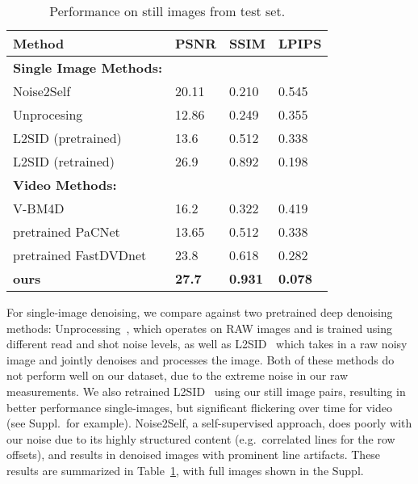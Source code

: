 \documentclass[final]{cvpr}
\begin{document}
\begin{table}[htbb]
\centering
\small
\begin{tabular}{|l|l|l|l|}
\hline
Method      & PSNR & SSIM & LPIPS\\ \hline
\textbf{Single Image Methods:} & & & \\ \hline
Noise2Self~\cite{batson2019noise2self} & 20.11 & 0.210 &  0.545 \\ \hline 
Unprocesing \cite{brooks2019unprocessing} & 12.86 & 0.249 & 0.355 \\ \hline 
L2SID (pretrained)~\cite{chen2018learning}      & 13.6 & 0.512& 0.338\\ \hline
L2SID (retrained) ~\cite{chen2018learning}    & 26.9 & 0.892 & 0.198 \\\hline
\textbf{Video Methods:} & & & \\ \hline
V-BM4D ~\cite{maggioni2012video}     & 16.2  & 0.322  & 0.419  \\\hline
pretrained PaCNet~\cite{vaksman2021patch}& 13.65 & 0.512  & 0.338 \\\hline
pretrained FastDVDnet~\cite{tassano2020fastdvdnet}& 23.8 &  0.618  & 0.282 \\\hline
\textbf{ours}        & \textbf{27.7}  & \textbf{0.931}   & \textbf{0.078}  \\\hline
\end{tabular}
\vspace{.5mm}
\caption{Performance on still images from test set.}
\label{tab:results_stills}
\vspace{-4mm}
\end{table}

For single-image denoising, we compare against two pretrained deep denoising methods: Unprocessing~\cite{brooks2019unprocessing}, which operates on RAW images and is trained using different read and shot noise levels, as well as L2SID~\cite{chen2018learning} which takes in a raw noisy image and jointly denoises and processes the image. Both of these methods do not perform well on our dataset, due to the extreme noise in our raw measurements. We also retrained L2SID~\cite{chen2018learning} using our still image pairs, resulting in better performance single-images, but significant flickering over time for video (see Suppl.\ for example). Noise2Self, a self-supervised approach, does poorly with our noise due to its highly structured content (e.g.\ correlated lines for the row offsets), and results in denoised images with prominent line artifacts. These results are summarized in Table~\ref{tab:results_stills}, with full images shown in the Suppl. 
\end{document}
